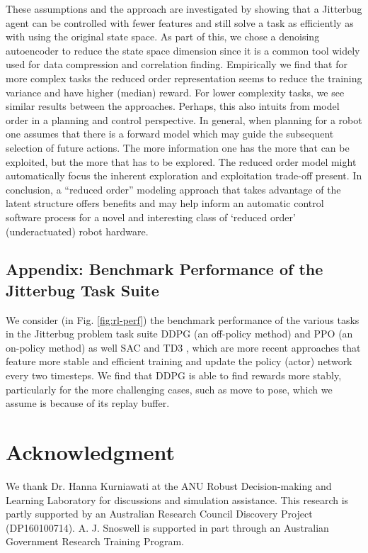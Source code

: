 \documentclass{article}
\begin{document}
These assumptions and the approach are investigated by showing that a Jitterbug agent can be controlled with fewer features and still solve a task as efficiently as with using the original state space.
As part of this, we chose a denoising autoencoder to reduce the state space dimension since it is a common tool widely used for data compression and correlation finding.  
Empirically we find that for more complex tasks the reduced order representation seems to reduce the training variance and have higher (median) reward.
For lower complexity tasks, we see similar results between the approaches.
Perhaps, this also intuits from model order in a planning and control perspective.
In general, when planning for a robot one assumes that there is a forward model which may guide the subsequent selection of future actions.
The more information one has the more that can be exploited, but the more that has to be explored.
The reduced order model might automatically focus the inherent exploration and exploitation trade-off present.
In conclusion, a ``reduced order'' modeling approach that takes advantage of the latent structure offers benefits and may help inform an automatic control software process for a novel and interesting class of `reduced order' (underactuated) robot hardware.


\vspace*{-6pt}
\subsection*{Appendix: Benchmark Performance of the Jitterbug Task Suite}\label{sec:app}

We consider (in Fig. \ref{fig:rl-perf}) the benchmark performance of the various tasks in the Jitterbug problem task suite DDPG \cite{DDPG} (an off-policy method) and PPO \cite{PPO} (an on-policy method) as well SAC \cite{SAC} and TD3 \cite{TD3}, which are more recent approaches that feature more stable and efficient training and update the policy (actor) network every two timesteps.  We find that DDPG is able to find rewards more stably, particularly for the more challenging cases, such as move to pose, which we assume is because of its replay buffer. %


\section*{Acknowledgment}
\vspace*{-6pt}
We thank Dr. Hanna Kurniawati at the ANU Robust Decision-making and Learning Laboratory for discussions and simulation assistance.
This research is partly supported by an Australian Research Council Discovery Project (DP160100714).
A. J. Snoswell is supported in part through an Australian Government Research Training Program.
\end{document}

